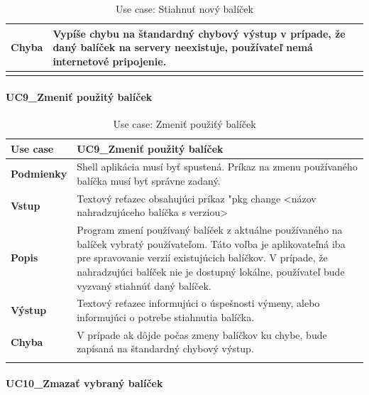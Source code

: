 {\begin{center}
\begin{longtable}{|p{2.5cm}|p{12.2cm}|}
			\textbf{Chyba} & Vypíše chybu na štandardný chybový výstup v prípade, že daný balíček na servery neexistuje, používateľ nemá internetové pripojenie.\\
			\hline
		\caption{Use case: Stiahnuť nový balíček}
		\label{table:1}
		
	\end{longtable}
\end{center}

\paragraph{UC9\_Zmeniť  použitý balíček}
\begin{center}
	\begin{longtable}{|p{2.5cm}|p{12.2cm}|}
		
			\hline
			\textbf{Use case} & UC9\_Zmeniť  použitý balíček \\ 
			\hline
			\textbf{Podmienky} & Shell aplikácia musí byť spustená. Príkaz na zmenu používaného balíčka musí byť správne zadaný.\\ 
			\hline
			\textbf{Vstup} & Textový reťazec obsahujúci príkaz "pkg change  <názov nahradzujúceho balíčka s verziou>\\
			\hline
			\textbf{Popis} & Program zmení používaný balíček z aktuálne používaného na balíček vybratý používateľom. Táto voľba je aplikovateľná iba pre spravovanie verzií existujúcich balíčkov. V prípade, že nahradzujúci balíček nie je dostupný lokálne, používateľ bude vyzvaný stiahnúť daný balíček.\\ 
			\hline
			\textbf{Výstup} & Textový reťazec informujúci o úspešnosti výmeny, alebo informujúci o potrebe stiahnutia balíčka.\\
			\hline
			\textbf{Chyba} & V prípade ak dôjde počas zmeny balíčkov ku chybe, bude zapísaná na štandardný chybový výstup.\\
			\hline
		\caption{Use case: Zmeniť  použiťý balíček}
		\label{table:1}
		
	\end{longtable}
\end{center}

\paragraph{UC10\_Zmazať vybraný balíček}
\begin{center}
	\begin{longtable}{|p{2.5cm}|p{12.2cm}|}
		

\end{longtable}
\end{center}}
